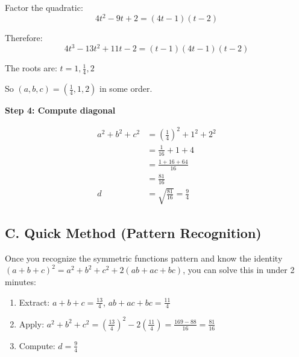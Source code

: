 \documentclass[12pt]{article}
\begin{document}
\begin{solutionbox}
Factor the quadratic:
$$4t^2 - 9t + 2 = (4t-1)(t-2)$$

Therefore:
$$4t^3 - 13t^2 + 11t - 2 = (t-1)(4t-1)(t-2)$$

The roots are: $t = 1, \frac{1}{4}, 2$

So $(a,b,c) = \left(\frac{1}{4}, 1, 2\right)$ in some order.

\textbf{Step 4: Compute diagonal}

\begin{align*}
    a^2 + b^2 + c^2 &= \left(\frac{1}{4}\right)^2 + 1^2 + 2^2\\
    &= \frac{1}{16} + 1 + 4\\
    &= \frac{1 + 16 + 64}{16}\\
    &= \frac{81}{16}\\
    d &= \sqrt{\frac{81}{16}} = \frac{9}{4}
\end{align*}

\subsection*{C. Quick Method (Pattern Recognition)}

Once you recognize the symmetric functions pattern and know the identity $(a+b+c)^2 = a^2+b^2+c^2+2(ab+ac+bc)$, you can solve this in under 2 minutes:

\begin{enumerate}
    \item Extract: $a+b+c = \frac{13}{4}$, $ab+ac+bc = \frac{11}{4}$
    \item Apply: $a^2+b^2+c^2 = \left(\frac{13}{4}\right)^2 - 2\left(\frac{11}{4}\right) = \frac{169-88}{16} = \frac{81}{16}$
    \item Compute: $d = \frac{9}{4}$
\end{enumerate}
\end{solutionbox}
\end{document}
